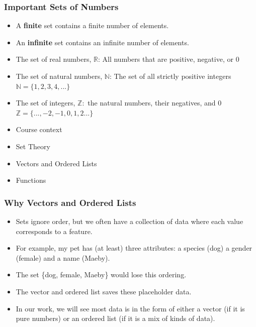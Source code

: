 \documentclass[aspectratio=169, handout]{beamer}
\numberwithin{equation}{section}
\begin{document}
\begin{frame}
\frametitle{Important Sets of Numbers}

\begin{itemize}
\item A \textbf{finite} set contains a finite number of elements. \pause

\item An \textbf{infinite} set contains an infinite number of elements.

\item The set of real numbers, $\mathbb{R}$: All numbers that are positive, negative, or 0 \pause

\item The set of natural numbers, $\mathbb{N}$: The set of all strictly positive integers \\$\mathbb{N}=\{1, 2, 3, 4, ...\}$ \pause

\item The set of integers, $\mathbb{Z}: $ the natural numbers, their negatives, and 0\\$\mathbb{Z}=\{..., -2, -1, 0, 1, 2 ...\}$
\end{itemize}

\end{frame}



\begin{frame}

\begin{itemize}
\item \textcolor{mygray}{Course context}
\item \textcolor{mygray}{Set Theory}
\item \textcolor{myblack}{Vectors and Ordered Lists}
\item \textcolor{mygray}{Functions}
\end{itemize}

\end{frame}



\begin{frame}
\frametitle{Why Vectors and Ordered Lists}
\begin{itemize}
\item Sets ignore order, but we often have a collection of data where each value corresponds to a feature.\pause
\item For example, my pet has (at least) three attributes: a species (dog) a gender (female) and a name (Maeby).\pause
\item The set \{dog, female, Maeby\} would lose this ordering.\pause
\item The vector and ordered list saves these placeholder data.\pause
\item In our work, we will see most data is in the form of either a vector (if it is pure numbers) or an ordered list (if it is a mix of kinds of data).
\end{itemize}
\end{frame}
\end{document}
